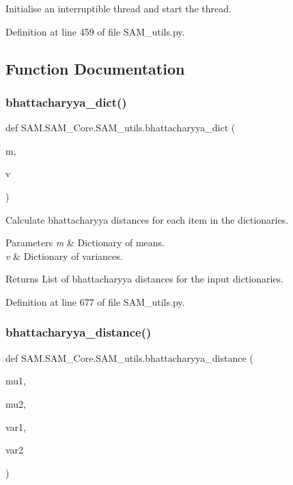 Initialise an interruptible thread and start the thread. 



Definition at line 459 of file S\+A\+M\+\_\+utils.\+py.



\subsection{Function Documentation}
\mbox{\label{group__icubclient__SAM__utils_ga9f9e9fc5c10660319b4d78dcb1a04d10}} 
\subsubsection{\texorpdfstring{bhattacharyya\+\_\+dict()}{bhattacharyya\_dict()}}
{\footnotesize\ttfamily def S\+A\+M.\+S\+A\+M\+\_\+\+Core.\+S\+A\+M\+\_\+utils.\+bhattacharyya\+\_\+dict (\begin{DoxyParamCaption}\item[{}]{m,  }\item[{}]{v }\end{DoxyParamCaption})}



Calculate bhattacharyya distances for each item in the dictionaries. 


\begin{DoxyParams}{Parameters}
{\em m} & Dictionary of means. \\
\hline
{\em v} & Dictionary of variances.\\
\hline
\end{DoxyParams}
\begin{DoxyReturn}{Returns}
List of bhattacharyya distances for the input dictionaries. 
\end{DoxyReturn}


Definition at line 677 of file S\+A\+M\+\_\+utils.\+py.

\mbox{\label{group__icubclient__SAM__utils_gafede13612da64cc2471be35b385972ed}} 
\subsubsection{\texorpdfstring{bhattacharyya\+\_\+distance()}{bhattacharyya\_distance()}}
{\footnotesize\ttfamily def S\+A\+M.\+S\+A\+M\+\_\+\+Core.\+S\+A\+M\+\_\+utils.\+bhattacharyya\+\_\+distance (\begin{DoxyParamCaption}\item[{}]{mu1,  }\item[{}]{mu2,  }\item[{}]{var1,  }\item[{}]{var2 }\end{DoxyParamCaption})}



